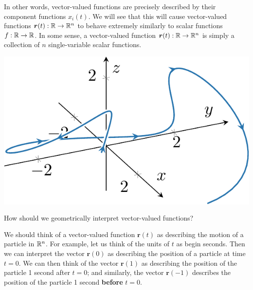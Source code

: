 In other words, vector-valued functions are precisely described by their component functions $x_i(t)$.  We will see that this will cause vector-valued functions $\bm{r}(t) : \mathbb{R} \to \mathbb{R}^n$ to behave extremely similarly to scalar functions $f : \mathbb{R} \to \mathbb{R}$.  In some sense, a vector-valued function $\bm{r}(t) : \mathbb{R} \to \mathbb{R}^n$ is simply a collection of $n$ single-variable scalar functions.
 \begin{center}        
        \includegraphics[scale=.75]{chapters/2-RealAnalysis/figures/figures-vectorval1.pdf}
    \end{center}

\begin{motivating}
How should we geometrically interpret vector-valued functions?
\end{motivating}

We should think of a vector-valued function $\bm{r}(t)$ as describing the motion of a particle in $\mathbb{R}^n$.  For example, let us think of the units of $t$ as begin seconds.  Then we can interpret the vector $\bm{r}(0)$ as describing the position of a particle at time $t=0$.  We can then think of the vector $\bm{r}(1)$ as describing the position of the particle 1 second after $t=0$; and similarly, the vector $\bm{r}(-1)$ describes the position of the particle 1 second \textbf{before} $t=0$.  

